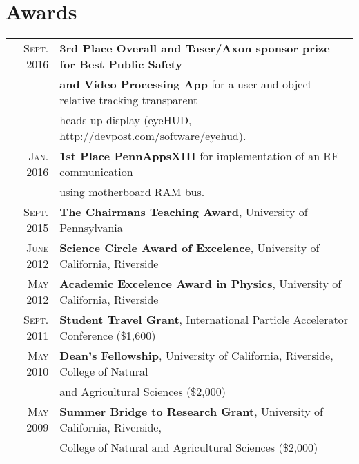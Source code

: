 \documentclass[a4paper,10pt]{article} %
\begin{document}

\section{Awards}

\begin{tabular}{rl}
\textsc{Sept.} 2016 & \textbf{3rd Place Overall and Taser/Axon sponsor prize for Best Public Safety} \\
					& \textbf{ and Video Processing App} for a user and object relative tracking transparent \\
					& heads up display (eyeHUD, http://devpost.com/software/eyehud). \\
\textsc{Jan.} 2016  & \textbf{1st Place PennAppsXIII} for implementation of an RF communication \\
 					& using motherboard RAM bus. \\
\textsc{Sept.} 2015 & \textbf{The Chairmans Teaching Award}, University of Pennsylvania \\
\textsc{June} 2012  & \textbf{Science Circle Award of Excelence}, University of California, Riverside \\
\textsc{May} 2012   & \textbf{Academic Excelence Award in Physics}, University of California, Riverside \\
\textsc{Sept.} 2011 & \textbf{Student Travel Grant}, International Particle Accelerator Conference \footnotesize(\$1,600)\normalsize\\
\textsc{May} 2010   & \textbf{Dean's Fellowship}, University of California, Riverside, College of Natural\\
				    & and Agricultural Sciences \footnotesize(\$2,000)\normalsize\\
\textsc{May} 2009   & \textbf{Summer Bridge to Research Grant}, University of California, Riverside, \\
			        & College of Natural and Agricultural Sciences \footnotesize(\$2,000)\normalsize\\

\end{tabular}








\end{document}

